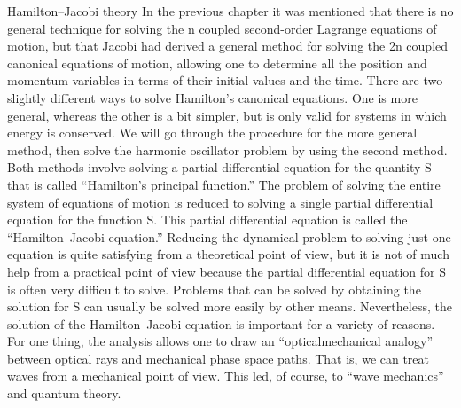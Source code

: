 Hamilton--Jacobi theory
In the previous chapter it was mentioned that there is no general technique for
solving the n coupled second-order Lagrange equations of motion, but that
Jacobi had derived a general method for solving the 2n coupled canonical
equations of motion, allowing one to determine all the position and momentum
variables in terms of their initial values and the time.
There are two slightly different ways to solve Hamilton's canonical equations. One is more general, whereas the other is a bit simpler, but is only valid
for systems in which energy is conserved. We will go through the procedure
for the more general method, then solve the harmonic oscillator problem by
using the second method.
Both methods involve solving a partial differential equation for the quantity
S that is called ``Hamilton's principal function.'' The problem of solving the
entire system of equations of motion is reduced to solving a single partial differential equation for the function S. This partial differential equation is called
the ``Hamilton--Jacobi equation.'' Reducing the dynamical problem to solving
just one equation is quite satisfying from a theoretical point of view, but it is
not of much help from a practical point of view because the partial differential equation for S is often very difficult to solve. Problems that can be solved
by obtaining the solution for S can usually be solved more easily by other
means.
Nevertheless, the solution of the Hamilton--Jacobi equation is important for
a variety of reasons. For one thing, the analysis allows one to draw an ``opticalmechanical analogy'' between optical rays and mechanical phase space paths.
That is, we can treat waves from a mechanical point of view. This led, of
course, to ``wave mechanics'' and quantum theory.
